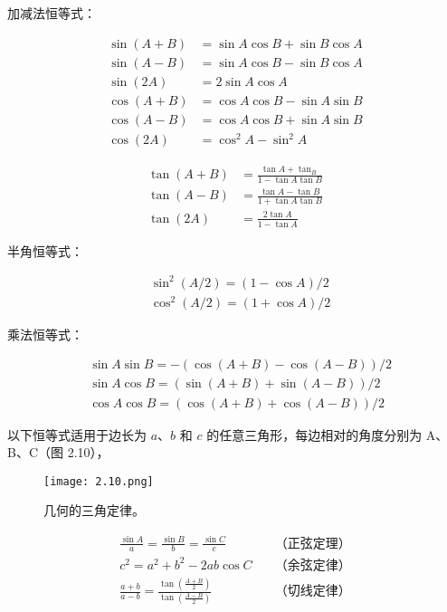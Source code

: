 \documentclass[lang=cn,12pt]{elegantbook}
\begin{document}
加减法恒等式：

$$
\begin{aligned}
\sin (A+B) &=\sin A \cos B+\sin B \cos A \\
\sin (A-B) &=\sin A \cos B-\sin B \cos A \\
\sin (2 A) &=2 \sin A \cos A \\
\cos (A+B) &=\cos A \cos B-\sin A \sin B \\
\cos (A-B) &=\cos A \cos B+\sin A \sin B \\
\cos (2 A) &=\cos ^{2} A-\sin ^{2} A
\end{aligned}
$$

$$
\begin{aligned}
\tan (A+B) &=\frac{\tan A+\tan _{B}}{1-\tan A \tan B} \\
\tan (A-B) &=\frac{\tan A-\tan B}{1+\tan A \tan B} \\
\tan (2 A) &=\frac{2 \tan A}{1  -\tan A}
\end{aligned}
$$

半角恒等式：

$$
\begin{aligned}
&\sin ^{2}(A / 2)=(1-\cos A) / 2 \\
&\cos ^{2}(A / 2)=(1+\cos A) / 2
\end{aligned}
$$

乘法恒等式：

$$
\begin{aligned}
&\sin A \sin B=-(\cos (A+B)-\cos (A-B)) / 2 \\
&\sin A \cos B=(\sin (A+B)+\sin (A-B)) / 2 \\
&\cos A \cos B=(\cos (A+B)+\cos (A-B)) / 2
\end{aligned}
$$

以下恒等式适用于边长为 $a$、$b$ 和 $c$ 的任意三角形，每边相对的角度分别为 A、B、C（图 2.10），

\begin{figure}[htbp]
\centering
\texttt{[image: 2.10.png]}
\caption{几何的三角定律。}
\end{figure}

$$
\begin{aligned}
\frac{\sin A}{a}=\frac{\sin B}{b}=\frac{\sin C}{c}\quad &\mbox{（正弦定理）}\\
c^{2}=a^{2}+b^{2}-2 a b \cos C\quad &\mbox{（余弦定律）}\\
\frac{a+b}{a-b}=\frac{\tan \left(\frac{A+B}{2}\right)}{\tan \left(\frac{A-B}{2}\right)}\quad &\mbox{（切线定律）}
\end{aligned}
$$
\end{document}
